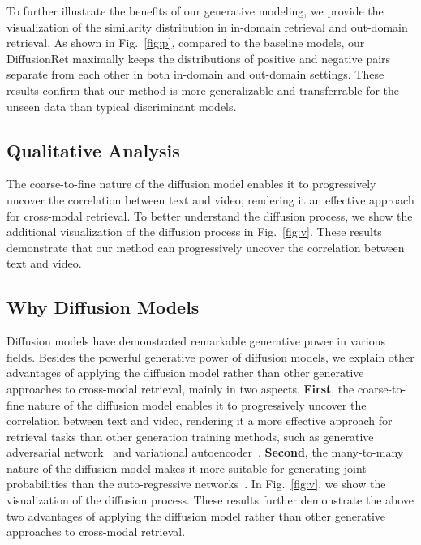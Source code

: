 \documentclass[10pt,twocolumn,letterpaper]{article}
\begin{document}
{To further illustrate the benefits of our generative modeling, we provide the visualization of the similarity distribution in in-domain retrieval and out-domain retrieval. As shown in Fig.~\ref{fig:p}, compared to the baseline models, our DiffusionRet maximally keeps the distributions of positive and negative pairs separate from each other in both in-domain and out-domain settings. These results confirm that our method is more generalizable and transferrable for the unseen data than typical discriminant models.

\subsection{Qualitative Analysis}
The coarse-to-fine nature of the diffusion model enables it to progressively uncover the correlation between text and video, rendering it an effective approach for cross-modal retrieval. To better understand the diffusion process, we show the additional visualization of the diffusion process in Fig.~\ref{fig:v}. These results demonstrate that our method can progressively uncover the correlation between text and video.

\subsection{Why Diffusion Models}
Diffusion models have demonstrated remarkable generative power in various fields. Besides the powerful generative power of diffusion models, we explain other advantages of applying the diffusion model rather than other generative approaches to cross-modal retrieval, mainly in two aspects. \textbf{First}, the coarse-to-fine nature of the diffusion model enables it to progressively uncover the correlation between text and video, rendering it a more effective approach for retrieval tasks than other generation training methods, such as generative adversarial network~\cite{goodfellow2020generative} and variational autoencoder~\cite{kingma2013auto}. \textbf{Second}, the many-to-many nature of the diffusion model makes it more suitable for generating joint probabilities than the auto-regressive networks~\cite{frey1995does,radford2018improving}. In Fig.~\ref{fig:v}, we show the visualization of the diffusion process. These results further demonstrate the above two advantages of applying the diffusion model rather than other generative approaches to cross-modal retrieval.

}
\end{document}
